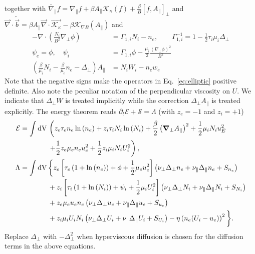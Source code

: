 together with
$\bar\nabla_\parallel f = \nabla_\parallel f + \beta A_\parallel \mathcal K_\kappa(f) + \frac{\beta}{B}[ f, A_\parallel]_\perp$
and $\vec \nabla \cdot \tilde{ \vec b} = \beta A_\parallel \vec \nabla\cdot\vec{ \mathcal{ K_\kappa}} - \beta \mathcal K_{\nabla B}(A_\parallel) $
and
\begin{subequations} \label{eq:elliptic}
  \begin{align}
    -\nabla\cdot\left( \frac{N_i}{B^2}\nabla_\perp \phi \right) &= \Gamma_{1,i} N_i - n_e, \quad\quad
    \Gamma_{1,i}^{-1} = 1-\frac{1}{2}\tau_i\mu_i \Delta_\perp \\
    \psi_e = \phi, \quad \psi_i &= \Gamma_{1,i}\phi -\frac{\mu_i}{2}\frac{(\nabla_\perp\phi)^2}{B^2} \\
    \left(\frac{\beta}{\mu_i}N_i - \frac{\beta}{\mu_e}n_e-\Delta_\perp\right)
    A_\parallel &= N_iW_i-n_e w_e
  \end{align}
\end{subequations}
Note that the negative signs make the operators in Eq.~\eqref{eq:elliptic} positive definite. Also note the peculiar notation of the perpendicular viscosity on $U$.
We indicate that $\Delta_\perp W$ is treated implicitly while the correction $\Delta_\perp A_\parallel$ is treated explicitly.
The energy theorem reads $\partial_t \mathcal E + \mathcal S = \Lambda$ (with $z_e=-1$ and $z_i=+1$)
\begin{align}
  \mathcal{E}= \int  \dV & \left( z_e\tau_e n_e \ln{(n_e)} +z_i\tau_i N_i\ln{(N_i)}
  +\frac{\beta}{2}\left(\vec \nabla_\perp A_\parallel\right)^2
   +  \frac{1}{2} \mu_i N_i u_E^2  \right .\nonumber\\
   &\left. +\frac{1}{2} z_e\mu_e  n_e u_e^2
  +\frac{1}{2} z_i\mu_i  N_i U_i^2  \right),\\
  \Lambda =  \int \dV & \bigg\{  z_e\left[\tau_e\left( 1+\ln{(n_e)}\right) + \phi + \frac{1}{2} \mu_e u_e^2 \right]
    \left(\nu_\perp\Delta_\perp n_e + \nu_\parallel\Delta_\parallel n_e + S_{n_e}\right)
  \nonumber\\ &
+z_i\left[\tau_i\left( 1+\ln{(N_i)}\right) + \psi_i + \frac{1}{2} \mu_i U_i^2 \right]
    \left(\nu_\perp\Delta_\perp N_i + \nu_\parallel\Delta_\parallel N_i +S_{N_i}\right)
\nonumber \\ &
    +z_e\mu_e u_e n_e \left(\nu_\perp\Delta_\perp u_e + \nu_\parallel \Delta_\parallel u_e + S_{u_e}\right)\nonumber \\ &
    +z_i\mu_i U_i N_i \left(\nu_\perp\Delta_\perp U_i + \nu_\parallel \Delta_\parallel U_i + S_{U_i}\right)%
    - \eta \left(n_e(U_i-u_e)\right)^2\bigg\}.
\end{align}
Replace $\Delta_\perp$ with $-\Delta_\perp^2$ when hyperviscous diffusion is chosen
for the diffusion terms in the above equations.
